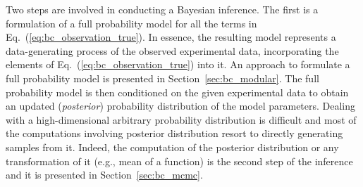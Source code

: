 Two steps are involved in conducting a Bayesian inference.
The first is a formulation of a full probability model for all the terms in Eq.~(\ref{eq:bc_observation_true}).
In essence, the resulting model represents a data-generating process of the observed experimental data,
incorporating the elements of Eq.~(\ref{eq:bc_observation_true}) into it.
An approach to formulate a full probability model is presented in Section~\ref{sec:bc_modular}.
The full probability model is then conditioned on the given experimental data to obtain an updated (\emph{posterior}) probability distribution of the model parameters.
Dealing with a high-dimensional arbitrary probability distribution is difficult and most of the computations involving  posterior distribution resort to directly generating samples from it. 
Indeed, the computation of the posterior distribution or any transformation of it (e.g., mean of a function) is the second step of the inference and it is presented in Section~\ref{sec:bc_mcmc}.
